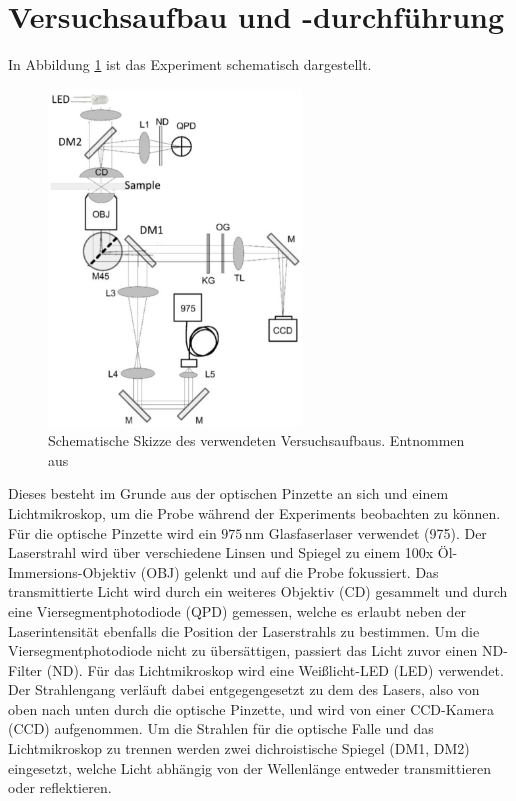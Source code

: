 \newpage
\section{Versuchsaufbau und -durchführung}
  In Abbildung \ref{fig:Aufbau} ist das Experiment schematisch dargestellt.
  \begin{figure}[h]
    \centering
    \includegraphics[width = 0.6\textwidth]{pictures/OPaufbau.png}
    \caption{Schematische Skizze des verwendeten Versuchsaufbaus. Entnommen aus \cite{tu_dortmund_versuchsanleitung_OptischePinzette}}
    \label{fig:Aufbau}
  \end{figure}
  Dieses besteht im Grunde aus der optischen Pinzette an sich und einem Lichtmikroskop, um die Probe während der Experiments beobachten zu können.
  Für die optische Pinzette wird ein $975\,\text{nm}$ Glasfaserlaser verwendet (975). Der Laserstrahl wird über verschiedene Linsen und Spiegel zu einem 100x Öl-Immersions-Objektiv (OBJ) gelenkt und auf die Probe fokussiert. Das transmittierte Licht wird durch ein weiteres Objektiv (CD) gesammelt und durch eine Viersegmentphotodiode (QPD) gemessen, welche es erlaubt neben der Laserintensität ebenfalls die Position der Laserstrahls zu bestimmen. Um die Viersegmentphotodiode nicht zu übersättigen, passiert das Licht zuvor einen ND-Filter (ND).
  Für das Lichtmikroskop wird eine Weißlicht-LED (LED) verwendet. Der Strahlengang verläuft dabei entgegengesetzt zu dem des Lasers, also von oben nach unten durch die optische Pinzette, und wird von einer CCD-Kamera (CCD) aufgenommen.
  Um die Strahlen für die optische Falle und das Lichtmikroskop zu trennen werden zwei dichroistische Spiegel (DM1, DM2) eingesetzt, welche Licht abhängig von der Wellenlänge entweder transmittieren oder reflektieren.
